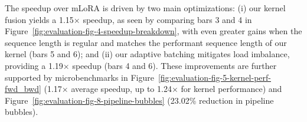 The speedup over mLoRA is driven by two main optimizations: (i) our kernel fusion yields a 1.15$\times$ speedup, as seen by comparing bars 3 and 4 in Figure~\ref{fig:evaluation-fig-4-speedup-breakdown}, with even greater gains when the sequence length is regular and matches the performant sequence length of our kernel (bars 5 and 6); and (ii) our adaptive batching mitigates load imbalance, providing a 1.19$\times$ speedup (bars 4 and 6). These improvements are further supported by microbenchmarks in Figure~\ref{fig:evaluation-fig-5-kernel-perf-fwd_bwd} (1.17$\times$ average speedup, up to 1.24$\times$ for kernel performance) and Figure~\ref{fig:evaluation-fig-8-pipeline-bubbles} (23.02\% reduction in pipeline bubbles).
